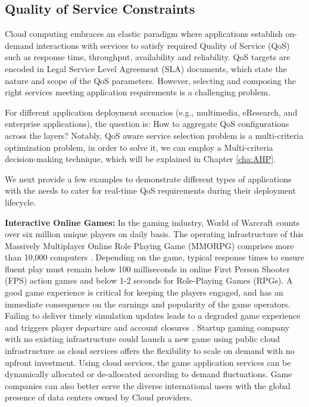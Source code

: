 \subsection{Quality of Service Constraints}
\label{sec:qos}

Cloud computing embraces an elastic paradigm where applications establish on-demand interactions with services to satisfy required Quality of Service (QoS) such as response time, throughput, availability and reliability. QoS targets are encoded in Legal Service Level Agreement (SLA) documents, which state the nature and scope of the QoS parameters. However, selecting and composing the right services meeting application requirements is a challenging problem.

For different application deployment scenarios (e.g., multimedia, eResearch, and enterprise applications),
the question is: How to aggregate QoS configurations across the layers?
Notably, QoS aware service selection problem \cite{Jaeger2005} is a multi-criteria optimization problem, in order to solve it, we can employ a Multi-criteria decision-making technique, which will be explained in Chapter \ref{cha:AHP}.

We next provide a few examples to demonstrate different types of applications with the needs to cater for real-time QoS requirements during their deployment lifecycle.

\textbf{Interactive Online Games:} In the gaming industry, World of Warcraft counts over six million unique players on daily basis. The operating infrastructure of this Massively Multiplayer Online Role Playing Game (MMORPG) comprises more than 10,000 computers \cite{nae2011dynamic}. Depending on the game, typical response times to ensure fluent play must remain below 100 milliseconds in online First Person Shooter (FPS) action games  \cite{beigbeder2004effects} and below 1-2 seconds for Role-Playing Games (RPGs). A good game experience is critical for keeping the players engaged, and has an immediate consequence on the earnings and popularity of the game operators. Failing to deliver timely simulation updates leads to a degraded game experience and triggers player departure and account closures \cite{shaikh2006demand}. Startup gaming company with no existing infrastructure could launch a new game using public cloud infrastructure as cloud services offers the flexibility to scale on demand with no upfront investment. Using cloud services, the game application services can be dynamically allocated or de-allocated according to demand fluctuations. Game companies can also better serve the diverse international users with the global presence of data centers owned by Cloud providers.

